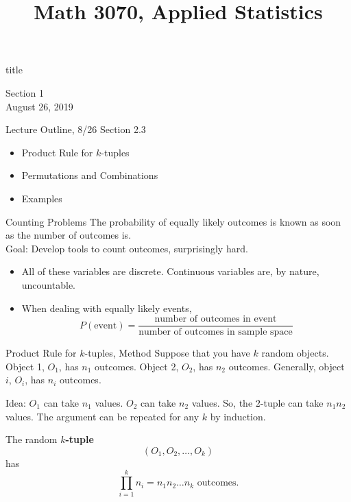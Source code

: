 \documentclass[handout]{beamer}
\title{Math 3070, Applied Statistics}
\newcommand{\nl}[1]{\vspace{#1 em}}
\begin{document}
\begin{frame}
    \begin{beamercolorbox}[rounded=true,wd=\textwidth,center]{title}
        \inserttitle
    \end{beamercolorbox}
    \begin{center}
        Section 1\\
        \nl{0.5}
        August 26, 2019
    \end{center}

\end{frame}

\begin{frame}{Lecture Outline, 8/26}
    Section 2.3
    \begin{itemize}
        \item Product Rule for $k$-tuples
        \item Permutations and Combinations
        \item Examples
    \end{itemize}
\end{frame}

\begin{frame}{Counting Problems}
    The probability of equally likely outcomes is known as soon as the number of outcomes is.\\
    \nl{0.5}
    Goal: Develop tools to count outcomes, surprisingly hard.\\
    \nl{0.5}
    \begin{itemize}
    \item All of these variables are discrete. Continuous variables are, by nature, uncountable.
    \item When dealing with equally likely events,
    \pause \[P(\text{event}) = \frac{\text{number of outcomes in event}}{\text{number of outcomes in sample space}}\]
    \end{itemize}
\end{frame}

\begin{frame}{Product Rule for $k$-tuples, Method}
    Suppose that you have $k$ random objects. Object 1, $O_1$, has $n_1$ outcomes. Object 2, $O_2$, has $n_2$ outcomes. Generally, object $i$, $O_i$, has $n_i$ outcomes. 
    
    \pause Idea: $O_1$ can take $n_1$ values.  $O_2$ can take $n_2$ values. So, the $2$-tuple can take $n_1 n_2$ values. The argument can be repeated for any $k$ by induction.

    \pause The random {\bf $k$-tuple}
    \[(O_1, O_2, \ldots, O_k)\]
    has 
    \[\prod_{i=1}^k n_i = n_1 n_2 \ldots n_k \text{ outcomes.}\]    
\end{frame}
\end{document}
